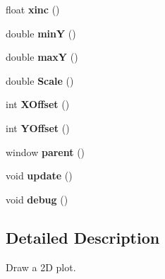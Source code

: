 \begin{DoxyCompactItemize}
\item 
\hypertarget{classnana_1_1plot_1_1plot_ac4b6cf680c0c2d8aa8ce28bdba3e6be7}{float {\bfseries xinc} ()}\label{classnana_1_1plot_1_1plot_ac4b6cf680c0c2d8aa8ce28bdba3e6be7}

\item 
\hypertarget{classnana_1_1plot_1_1plot_a7df61fa90c6f20a3ec781fe9aae655cc}{double {\bfseries min\-Y} ()}\label{classnana_1_1plot_1_1plot_a7df61fa90c6f20a3ec781fe9aae655cc}

\item 
\hypertarget{classnana_1_1plot_1_1plot_aae2bfb17d5ccf8bc4e02ea95baef6bf4}{double {\bfseries max\-Y} ()}\label{classnana_1_1plot_1_1plot_aae2bfb17d5ccf8bc4e02ea95baef6bf4}

\item 
\hypertarget{classnana_1_1plot_1_1plot_ad6e48b3394aae14d2b4a5fb2861e979b}{double {\bfseries Scale} ()}\label{classnana_1_1plot_1_1plot_ad6e48b3394aae14d2b4a5fb2861e979b}

\item 
\hypertarget{classnana_1_1plot_1_1plot_a050920266a3ce42ff586dc30e4b3e751}{int {\bfseries X\-Offset} ()}\label{classnana_1_1plot_1_1plot_a050920266a3ce42ff586dc30e4b3e751}

\item 
\hypertarget{classnana_1_1plot_1_1plot_a45eda9b995045d7a888aed017de555aa}{int {\bfseries Y\-Offset} ()}\label{classnana_1_1plot_1_1plot_a45eda9b995045d7a888aed017de555aa}

\item 
\hypertarget{classnana_1_1plot_1_1plot_a2830cb45a1053bf68f3b2b851ae4ea02}{window {\bfseries parent} ()}\label{classnana_1_1plot_1_1plot_a2830cb45a1053bf68f3b2b851ae4ea02}

\item 
\hypertarget{classnana_1_1plot_1_1plot_a770b2805bc876fb1616fbe5ee28a135d}{void {\bfseries update} ()}\label{classnana_1_1plot_1_1plot_a770b2805bc876fb1616fbe5ee28a135d}

\item 
\hypertarget{classnana_1_1plot_1_1plot_aa444d13347e0893ebf79951ad3608732}{void {\bfseries debug} ()}\label{classnana_1_1plot_1_1plot_aa444d13347e0893ebf79951ad3608732}

\end{DoxyCompactItemize}


\subsection{Detailed Description}
Draw a 2\-D plot. 


